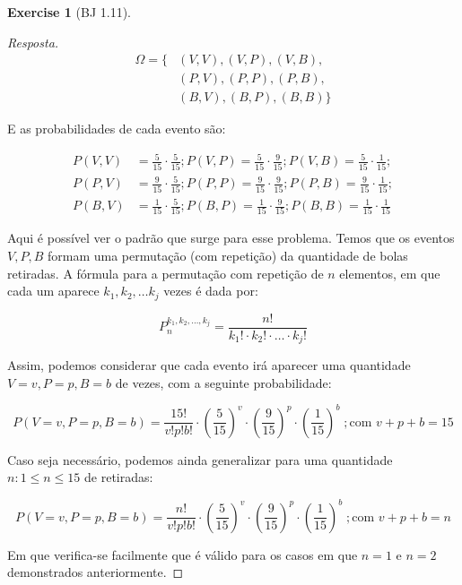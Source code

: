 \documentclass[
]{article}
\theoremstyle{definition}
\theoremstyle{definition}
\theoremstyle{definition}
\newtheorem{exercise}{Exercise}[section]
\theoremstyle{definition}
\theoremstyle{remark}
\begin{document}
\begin{exercise}[BJ 1.11]
\begin{proof}[Resposta]
\begin{align*}
\Omega = \{&(V,V), (V,P), (V,B), \\
&(P,V), (P,P), (P,B), \\
&(B,V), (B,P), (B,B)\}
\end{align*}

E as probabilidades de cada evento são:

\begin{align*}
P(V,V) &= \frac{5}{15} \cdot \frac{5}{15}; P(V,P) = \frac{5}{15} \cdot \frac{9}{15}; P(V,B) = \frac{5}{15} \cdot \frac{1}{15};\\
P(P,V) &= \frac{9}{15} \cdot \frac{5}{15}; P(P,P) = \frac{9}{15} \cdot \frac{9}{15}; P(P,B) = \frac{9}{15} \cdot \frac{1}{15};\\
P(B,V) &= \frac{1}{15} \cdot \frac{5}{15}; P(B,P) = \frac{1}{15} \cdot \frac{9}{15}; P(B,B) = \frac{1}{15} \cdot \frac{1}{15}
\end{align*}

Aqui é possível ver o padrão que surge para esse problema. Temos que os eventos \(V,P,B\) formam uma permutação (com repetição) da quantidade de bolas retiradas. A fórmula para a permutação com repetição de \(n\) elementos, em que cada um aparece \(k_{1},k_{2}, \dots k_{j}\) vezes é dada por:

\begin{equation*}
P_{n}^{k_{1},k_{2},\dots,k_{j}} = \frac{n!}{k_{1}! \cdot k_{2}! \cdot \dots \cdot k_{j}!}
\end{equation*}

Assim, podemos considerar que cada evento irá aparecer uma quantidade \(V = v, P = p, B = b\) de vezes, com a seguinte probabilidade:

\begin{equation*}
P(V=v, P=p, B=b) = \frac{15!}{v!p!b!} \cdot \left(\frac{5}{15}\right)^{v} \cdot \left(\frac{9}{15}\right)^{p} \cdot \left(\frac{1}{15}\right)^{b} \; ; \text{com }v+p+b = 15
\end{equation*}

Caso seja necessário, podemos ainda generalizar para uma quantidade \(n : 1 \le n \le 15\) de retiradas:

\begin{equation*}
P(V=v, P=p, B=b) = \frac{n!}{v!p!b!} \cdot \left(\frac{5}{15}\right)^{v} \cdot \left(\frac{9}{15}\right)^{p} \cdot \left(\frac{1}{15}\right)^{b} \; ; \text{com }v+p+b = n
\end{equation*}

Em que verifica-se facilmente que é válido para os casos em que \(n=1\) e \(n=2\) demonstrados anteriormente.
\end{proof}


\end{exercise}
\end{document}
